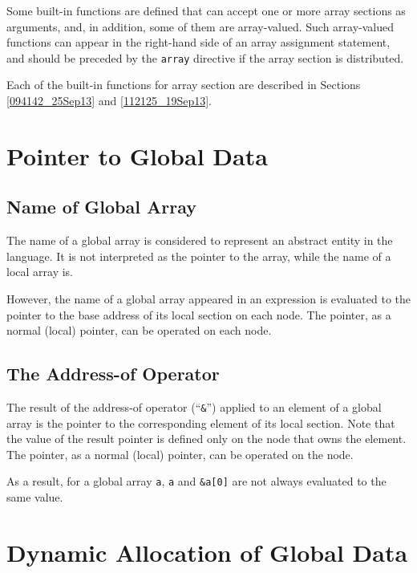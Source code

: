 Some built-in functions are defined that can accept one or more array
sections as arguments, and, in addition, some of them are array-valued.
%
Such array-valued functions can appear in the right-hand side of an
array assignment statement, and should be preceded by the {\tt array}
directive if the array section is distributed.

Each of the built-in functions for array section are described in
Sections \ref{094142_25Sep13} and \ref{112125_19Sep13}.


\section{Pointer to Global Data}
\label{sec:pointer to global data}

\subsection{Name of Global Array}

The name of a global array is considered to represent an abstract entity
in the {\XMP} language. It is not interpreted as the pointer to the array,
while the name of a local array is.

However, the name of a global array appeared in an expression is
evaluated to the pointer to the base address of its local section on
each node. The pointer, as a normal (local) pointer, can be operated on
each node.

\subsection{The Address-of Operator}

The result of the address-of operator (``{\tt \&}'') applied to an
element of a global array is the pointer to the corresponding element of
its local section. Note that the value of the result pointer is defined
only on the node that owns the element. The pointer, as a normal (local)
pointer, can be operated on the node.

As a result, for a global array {\tt a}, {\tt a} and {\tt \&a[0]} are
not always evaluated to the same value.

\section{Dynamic Allocation of Global Data}
\label{sec:Dynamic Allocation of Global Data in C}

